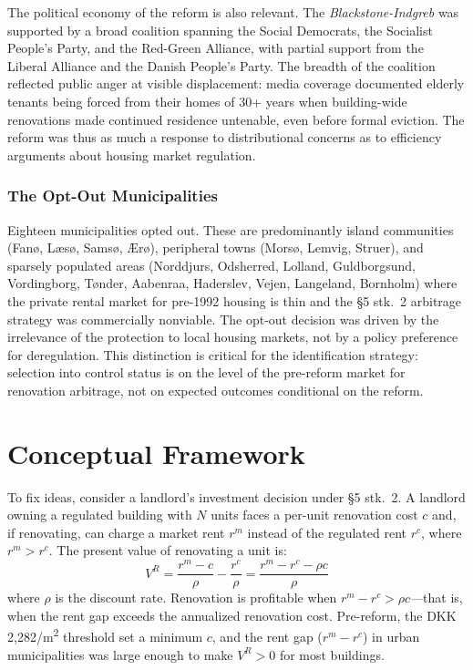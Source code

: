 \documentclass[12pt]{article}
\begin{document}
The political economy of the reform is also relevant. The \emph{Blackstone-Indgreb} was supported by a broad coalition spanning the Social Democrats, the Socialist People's Party, and the Red-Green Alliance, with partial support from the Liberal Alliance and the Danish People's Party. The breadth of the coalition reflected public anger at visible displacement: media coverage documented elderly tenants being forced from their homes of 30+ years when building-wide renovations made continued residence untenable, even before formal eviction. The reform was thus as much a response to distributional concerns as to efficiency arguments about housing market regulation.

\subsubsection*{The Opt-Out Municipalities} Eighteen municipalities opted out. These are predominantly island communities (Fan{\o}, L{\ae}s{\o}, Sams{\o}, {\AE}r{\o}), peripheral towns (Mors{\o}, Lemvig, Struer), and sparsely populated areas (Norddjurs, Odsherred, Lolland, Guldborgsund, Vordingborg, T{\o}nder, Aabenraa, Haderslev, Vejen, Langeland, Bornholm) where the private rental market for pre-1992 housing is thin and the \S5 stk.\ 2 arbitrage strategy was commercially nonviable. The opt-out decision was driven by the irrelevance of the protection to local housing markets, not by a policy preference for deregulation. This distinction is critical for the identification strategy: selection into control status is on the level of the pre-reform market for renovation arbitrage, not on expected outcomes conditional on the reform.

\section{Conceptual Framework}

To fix ideas, consider a landlord's investment decision under \S5 stk.\ 2. A landlord owning a regulated building with $N$ units faces a per-unit renovation cost $c$ and, if renovating, can charge a market rent $r^m$ instead of the regulated rent $r^c$, where $r^m > r^c$. The present value of renovating a unit is:
\begin{equation}
V^R = \frac{r^m - c}{\rho} - \frac{r^c}{\rho} = \frac{r^m - r^c - \rho c}{\rho}
\end{equation}
\noindent where $\rho$ is the discount rate. Renovation is profitable when $r^m - r^c > \rho c$---that is, when the rent gap exceeds the annualized renovation cost. Pre-reform, the DKK 2,282/m\textsuperscript{2} threshold set a minimum $c$, and the rent gap ($r^m - r^c$) in urban municipalities was large enough to make $V^R > 0$ for most buildings.
\end{document}
